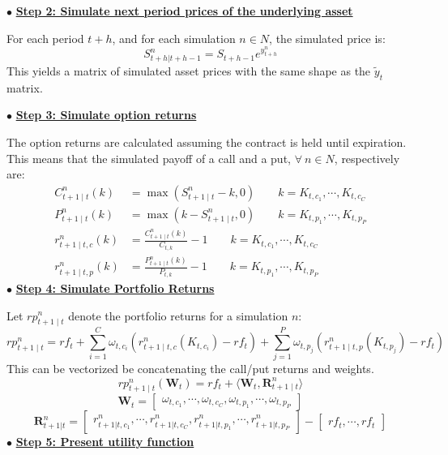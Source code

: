 $\bullet$ \underline{\textbf{Step 2: Simulate next period prices of the underlying asset}}

For each period $t + h$, and for each simulation $n \in N$, the simulated price is:
\noindent
\[S_{t + h|t+h-1}^{n} = S_{t + h - 1} e^{y_{t + h}^{n}}\]
\noindent
This yields a matrix of simulated asset prices with the same shape as the $\tilde{y}_{t}$ matrix.

$\bullet$ \underline{\textbf{Step 3: Simulate option returns}}

The option returns are calculated assuming the contract is held until expiration. This means that the simulated payoff of a call and a put, $\forall \ n \in N$, respectively are:
\noindent
\begin{align} 
\nonumber C_{t+1 \mid t}^{n}(k) &= \max (S_{t+1 \mid t}^{n} - k, 0) \quad \quad k = K_{t, c_{1}}, \cdots, K_{t, c_{C}} 
\\ \nonumber P_{t+1 \mid t}^{n}(k) &= \max (k - S_{t+1 \mid t}^{n}, 0) \quad \quad k = K_{t, p_{1}}, \cdots, K_{t, p_{P}}
\\ \nonumber r_{t+1 \mid t, c}^{n}(k) &= \frac{C_{t+1 \mid t}^{n}(k)}{C_{t, k}} - 1 \quad \quad k = K_{t, c_{1}}, \cdots, K_{t, c_{C}}
\\ \nonumber r_{t+1 \mid t, p}^{n}(k) &= \frac{P_{t+1 \mid t}^{n}(k)}{P_{t, k}} - 1 \quad \quad k = K_{t, p_{1}}, \cdots, K_{t, p_{P}}
\end{align}
\noindent
$\bullet$ \underline{\textbf{Step 4: Simulate Portfolio Returns}}

Let $rp_{t+1 \mid t}^{n}$ denote the portfolio returns for a simulation $n$:
\noindent
\[rp_{t+1 \mid t}^{n} = rf_{t} + \sum_{i = 1}^{C} \omega_{t, c_{i}}(r_{t+1 \mid t, c}^{n}(K_{t, c_{i}}) - rf_{t}) + \sum_{j = 1}^{P} \omega_{t, p_{j}}(r_{t+1 \mid t, p}^{n}(K_{t, p_{j}}) - rf_{t})\]
\noindent
This can be vectorized be concatenating the call/put returns and weights.
\noindent
\[rp_{t+1 \mid t}^{n}(\mathbf{W}_{t})= rf_{t} + \langle\mathbf{W}_{t}, \mathbf{R}_{t+1 \mid t}^{n}\rangle\]
\noindent
\[\mathbf{W}_{t} = \begin{bmatrix} \omega_{t, c_{1}}, \dotsb, \omega_{t, c_{C}}, \omega_{t, p_{1}}, \dotsb, \omega_{t, p_{P}} \end{bmatrix}\]
\[\mathbf{R}_{t+1|t}^{n} = \begin{bmatrix} r_{t + 1|t, c_{1}}^{n}, \dotsb, r_{t + 1|t, c_{C}}^{n}, r_{t + 1|t, p_{1}}^{n}, \dotsb, r_{t + 1|t, p_{P}}^{n} \end{bmatrix} - \begin{bmatrix} rf_{t}, \dotsb, rf_{t} \end{bmatrix}\]
\noindent
$\bullet$ \underline{\textbf{Step 5: Present utility function}}

